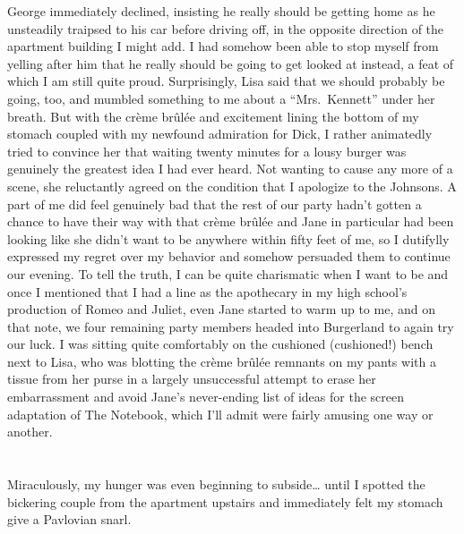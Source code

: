 \documentclass[]{book}
\begin{document}
George immediately declined, insisting he really should be getting home
as he unsteadily traipsed to his car before driving off, in the opposite
direction of the apartment building I might add. I had somehow been able
to stop myself from yelling after him that he really should be going to
get looked at instead, a feat of which I am still quite proud.
Surprisingly, Lisa said that we should probably be going, too, and
mumbled something to me about a ``Mrs.~Kennett'' under her breath. But
with the crème brûlée and excitement lining the bottom of my stomach
coupled with my newfound admiration for Dick, I rather animatedly tried
to convince her that waiting twenty minutes for a lousy burger was
genuinely the greatest idea I had ever heard. Not wanting to cause any
more of a scene, she reluctantly agreed on the condition that I
apologize to the Johnsons. A part of me did feel genuinely bad that the
rest of our party hadn't gotten a chance to have their way with that
crème brûlée and Jane in particular had been looking like she didn't
want to be anywhere within fifty feet of me, so I dutifylly expressed my
regret over my behavior and somehow persuaded them to continue our
evening. To tell the truth, I can be quite charismatic when I want to be
and once I mentioned that I had a line as the apothecary in my high
school's production of Romeo and Juliet, even Jane started to warm up to
me, and on that note, we four remaining party members headed into
Burgerland to again try our luck. I was sitting quite comfortably on the
cushioned (cushioned!) bench next to Lisa, who was blotting the crème
brûlée remnants on my pants with a tissue from her purse in a largely
unsuccessful attempt to erase her embarrassment and avoid Jane's
never-ending list of ideas for the screen adaptation of The Notebook,
which I'll admit were fairly amusing one way or another.

\chapter{}\label{section-10}

Miraculously, my hunger was even beginning to subside\ldots{} until I
spotted the bickering couple from the apartment upstairs and immediately
felt my stomach give a Pavlovian snarl.
\end{document}
